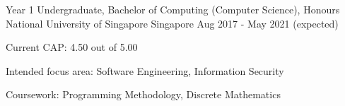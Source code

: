 

\begin{cventries}

  \cventry
    {Year 1 Undergraduate, Bachelor of Computing (Computer Science), Honours} %
    {National University of Singapore} %
    {Singapore} %
    {Aug 2017 - May 2021 (expected)} %
    {
      \begin{cvitems} %
        \item {Current CAP: 4.50 out of 5.00}
        \item {Intended focus area: Software Engineering, Information Security}
        \item {Coursework: Programming Methodology, Discrete Mathematics}
      \end{cvitems}
    }

\end{cventries}
